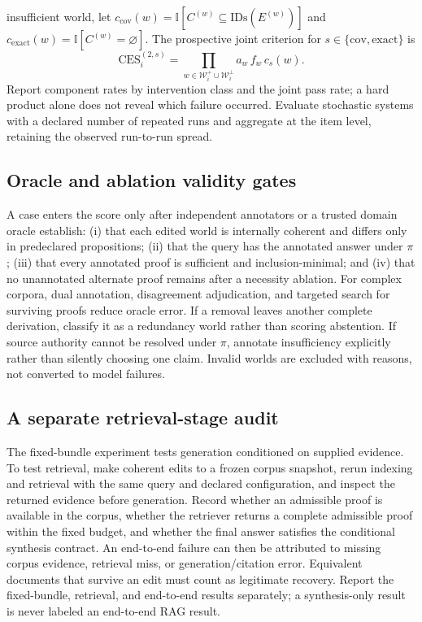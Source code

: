 \documentclass[10pt,twocolumn]{article}
\newcommand{\ind}{\mathbb{I}}
\begin{document}
insufficient world, let $c_{\mathrm{cov}}(w)=\ind[C^{(w)}
\subseteq\mathrm{IDs}(E^{(w)})]$ and
$c_{\mathrm{exact}}(w)=\ind[C^{(w)}=\varnothing]$. The prospective joint
criterion for $s\in\{\mathrm{cov},\mathrm{exact}\}$ is
\begin{equation}
\mathrm{CES}^{(2,s)}_i=
\prod_{w\in\mathcal{W}^{+}_i\cup\mathcal{W}^{\bot}_i}
a_w\,f_w\,c_s(w).
\end{equation}
Report component rates by intervention class and the joint pass rate; a hard
product alone does not reveal which failure occurred. Evaluate stochastic
systems with a declared number of repeated runs and aggregate at the item
level, retaining the observed run-to-run spread.

\subsection{Oracle and ablation validity gates}

A case enters the score only after independent annotators or a trusted
domain oracle establish: (i) that each edited world is internally coherent
and differs only in predeclared propositions; (ii) that the query has the
annotated answer under $\pi$; (iii) that every annotated proof is sufficient
and inclusion-minimal; and (iv) that no unannotated alternate proof remains
after a necessity ablation. For complex corpora, dual annotation,
disagreement adjudication, and targeted search for surviving proofs reduce
oracle error. If a removal leaves another complete derivation, classify it
as a redundancy world rather than scoring abstention. If source authority
cannot be resolved under $\pi$, annotate insufficiency explicitly rather
than silently choosing one claim. Invalid worlds are excluded with reasons,
not converted to model failures.

\subsection{A separate retrieval-stage audit}

The fixed-bundle experiment tests generation conditioned on supplied
evidence. To test retrieval, make coherent edits to a frozen corpus
snapshot, rerun indexing and retrieval with the same query and declared
configuration, and inspect the returned evidence before generation. Record
whether an admissible proof is available in the corpus, whether the
retriever returns a complete admissible proof within the fixed budget, and
whether the final answer satisfies the conditional synthesis contract.
An end-to-end failure can then be attributed to missing corpus evidence,
retrieval miss, or generation/citation error. Equivalent documents that
survive an edit must count as legitimate recovery. Report the fixed-bundle,
retrieval, and end-to-end results separately; a synthesis-only result is
never labeled an end-to-end RAG result.
\end{document}
